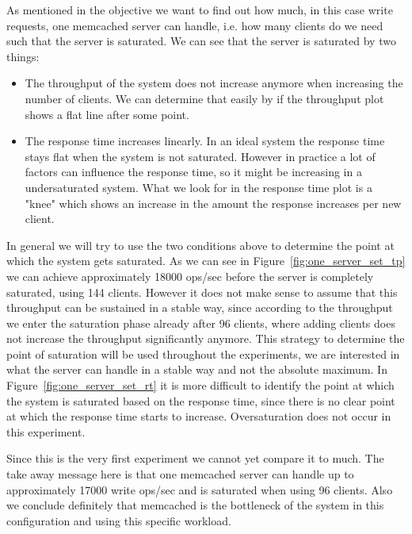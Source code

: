 \documentclass[11pt,a4paper]{article}
\begin{document}
%
As mentioned in the objective we want to find out how much, in this case write requests, one memcached server can handle, i.e. how many clients do we need such that the server is saturated.
%
We can see that the server is saturated by two things:
%
\begin{itemize}
	\item The throughput of the system does not increase anymore when increasing the number of clients. We can determine that easily by if the throughput plot shows a flat line after some point.
	\item The response time increases linearly. In an ideal system the response time stays flat when the system is not saturated. However in practice a lot of factors can influence the response time, so it might be increasing in a undersaturated system. What we look for in the response time plot is a "knee" which shows an increase in the amount the response increases per new client. 
\end{itemize}
%
In general we will try to use the two conditions above to determine the point at which the system gets saturated.
%
As we can see in Figure~\ref{fig:one_server_set_tp} we can achieve approximately 18000 ops/sec before the server is completely saturated, using 144 clients.
%
However it does not make sense to assume that this throughput can be sustained in a stable way, since according to the throughput we enter the saturation phase already after 96 clients, where adding clients does not increase the throughput significantly anymore.
%
This strategy to determine the point of saturation will be used throughout the experiments, we are interested in what the server can handle in a stable way and not the absolute maximum.
%
In Figure~\ref{fig:one_server_set_rt} it is more difficult to identify the point at which the system is saturated based on the response time, since there is no clear point at which the response time starts to increase.
%
Oversaturation does not occur in this experiment.
%
\par
%
Since this is the very first experiment we cannot yet compare it to much.
%
The take away message here is that one memcached server can handle up to approximately 17000 write ops/sec and is saturated when using 96 clients.
%
Also we conclude definitely that memcached is the bottleneck of the system in this configuration and using this specific workload.
%
\end{document}
